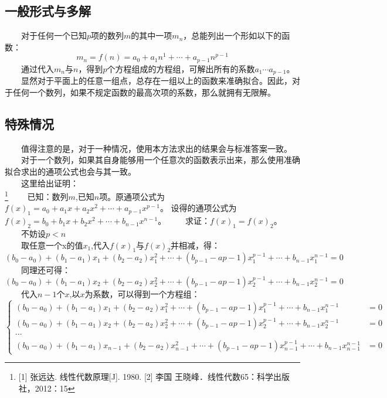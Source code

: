 \documentclass[12pt]{article}
\begin{document}
      \subsection{一般形式与多解}
        　　对于任何一个已知$p$项的数列$m$的其中一项$m_{n}$，总能列出一个形如以下的函数：
        \begin{equation}
          m_{n}=f(n)=a_{0}+a_{1}n^{1}+\cdots+a_{p-1}n^{p-1}
        \end{equation}
        　　通过代入$m_{n}$与$n$，得到$p$个方程组成的方程组，可解出所有的系数$a_{1}\cdots{}a_{p-1}$。\\
        　　显然对于平面上的任意一组点，总存在一组以上的函数来准确拟合。因此，对于任何一个数列，如果不规定函数的最高次项的系数，那么就拥有无限解。
      \subsection{特殊情况}
        　　值得注意的是，对于一种情况，使用本方法求出的结果会与标准答案一致。\\
        　　对于一个数列，如果其自身能够用一个任意次的函数表示出来，那么使用准确拟合求出的通项公式也会与其一致。\\
        　　这里给出证明：\\\footnote{[1] 张远达. 线性代数原理[J]. 1980. [2] 李国 王晓峰．线性代数65：科学出版社，2012：15}
        　　已知：数列$m$,已知$n$项。原通项公式为$f(x)_{1}=a_{0}+a_{1}x+a_{2}x^{2}+\cdots{}+a_{p-1}x^{p-1}$。
        设得的通项公式为$f(x)_{2}=b_{0}+b_{1}x+b_{2}x^{2}+\cdots{}+b_{n-1}x^{n-1}$。
        　　求证：$f(x)_{1}=f(x)_{2}$。\\
        　　不妨设$p<n$\\
        　　取任意一个x的值$x_{1}$,代入$f(x)_{1}$与$f(x)_{2}$并相减，得：
        \begin{equation}
          (b_{0}-a_{0})+(b_{1}-a_{1})x_{1}+(b_{2}-a_{2})x_{1}^{2}+\cdots+(b_{p-1}-a{p-1})x_{1}^{p-1}+\cdots+b_{n-1}x_{1}^{n-1}=0
        \end{equation}
        　　同理还可得：
        \begin{equation}
          (b_{0}-a_{0})+(b_{1}-a_{1})x_{2}+(b_{2}-a_{2})x_{2}^{2}+\cdots+(b_{p-1}-a{p-1})x_{2}^{p-1}+\cdots+b_{n-1}x_{2}^{n-1}=0
        \end{equation}
        　　代入$n-1$个$x$,以$x$为系数，可以得到一个方程组：
        \begin{equation}
          \left\{
            \begin{aligned}
              (b_{0}-a_{0})+(b_{1}-a_{1})x_{1}+(b_{2}-a_{2})x_{1}^{2}+\cdots+(b_{p-1}-a{p-1})x_{1}^{p-1}+\cdots+b_{n-1}x_{1}^{n-1}&=0\\
              (b_{0}-a_{0})+(b_{1}-a_{1})x_{2}+(b_{2}-a_{2})x_{2}^{2}+\cdots+(b_{p-1}-a{p-1})x_{2}^{p-1}+\cdots+b_{n-1}x_{2}^{n-1}&=0\\
              \cdots\\
              (b_{0}-a_{0})+(b_{1}-a_{1})x_{n-1}+(b_{2}-a_{2})x_{n-1}^{2}+\cdots+(b_{p-1}-a{p-1})x_{n-1}^{p-1}+\cdots+b_{n-1}x_{n-1}^{n-1}&=0
            \end{aligned}
          \right.
        \end{equation}
\end{document}
